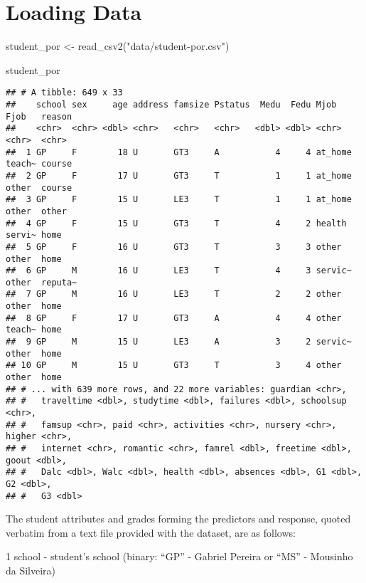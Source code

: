 \documentclass[
]{article}
\newenvironment{Shaded}{\begin{snugshade}}{\end{snugshade}}
\newcommand{\FunctionTok}[1]{\textcolor[rgb]{0.00,0.00,0.00}{#1}}
\newcommand{\NormalTok}[1]{#1}
\newcommand{\OtherTok}[1]{\textcolor[rgb]{0.56,0.35,0.01}{#1}}
\newcommand{\StringTok}[1]{\textcolor[rgb]{0.31,0.60,0.02}{#1}}
\begin{document}
\hypertarget{loading-data}{%
\section{Loading Data}\label{loading-data}}

\begin{Shaded}
\begin{Highlighting}[]
\NormalTok{student\_por }\OtherTok{\textless{}{-}} \FunctionTok{read\_csv2}\NormalTok{(}\StringTok{"data/student{-}por.csv"}\NormalTok{)}

\NormalTok{student\_por}
\end{Highlighting}
\end{Shaded}

\begin{verbatim}
## # A tibble: 649 x 33
##    school sex     age address famsize Pstatus  Medu  Fedu Mjob    Fjob   reason 
##    <chr>  <chr> <dbl> <chr>   <chr>   <chr>   <dbl> <dbl> <chr>   <chr>  <chr>  
##  1 GP     F        18 U       GT3     A           4     4 at_home teach~ course 
##  2 GP     F        17 U       GT3     T           1     1 at_home other  course 
##  3 GP     F        15 U       LE3     T           1     1 at_home other  other  
##  4 GP     F        15 U       GT3     T           4     2 health  servi~ home   
##  5 GP     F        16 U       GT3     T           3     3 other   other  home   
##  6 GP     M        16 U       LE3     T           4     3 servic~ other  reputa~
##  7 GP     M        16 U       LE3     T           2     2 other   other  home   
##  8 GP     F        17 U       GT3     A           4     4 other   teach~ home   
##  9 GP     M        15 U       LE3     A           3     2 servic~ other  home   
## 10 GP     M        15 U       GT3     T           3     4 other   other  home   
## # ... with 639 more rows, and 22 more variables: guardian <chr>,
## #   traveltime <dbl>, studytime <dbl>, failures <dbl>, schoolsup <chr>,
## #   famsup <chr>, paid <chr>, activities <chr>, nursery <chr>, higher <chr>,
## #   internet <chr>, romantic <chr>, famrel <dbl>, freetime <dbl>, goout <dbl>,
## #   Dalc <dbl>, Walc <dbl>, health <dbl>, absences <dbl>, G1 <dbl>, G2 <dbl>,
## #   G3 <dbl>
\end{verbatim}

The student attributes and grades forming the predictors and response,
quoted verbatim from a text file provided with the dataset, are as
follows:

1 school - student's school (binary: ``GP'' - Gabriel Pereira or ``MS''
- Mousinho da Silveira)
\end{document}
